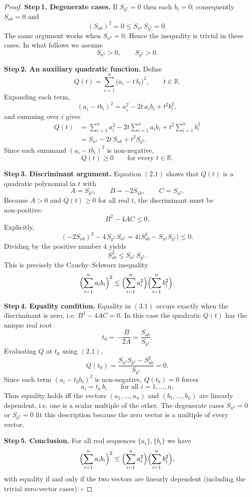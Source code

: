\begin{proof}
\textbf{Step 1. Degenerate cases.}  
If \(S_{b^{2}}=0\) then each \(b_{i}=0\); consequently \(S_{ab}=0\) and
\[
(S_{ab})^{2}=0\le S_{a^{2}}\,S_{b^{2}}=0 .
\]
The same argument works when \(S_{a^{2}}=0\). Hence the inequality is trivial
in these cases. In what follows we assume
\[
S_{a^{2}}>0,\qquad S_{b^{2}}>0 .
\]

\textbf{Step 2. An auxiliary quadratic function.}  
Define
\[
Q(t)=\sum_{i=1}^{n}\bigl(a_{i}-t\,b_{i}\bigr)^{2},\qquad t\in\mathbb{R}.
\]
Expanding each term,
\[
(a_{i}-t b_{i})^{2}=a_{i}^{2}-2t\,a_{i}b_{i}+t^{2}b_{i}^{2},
\]
and summing over \(i\) gives
\begin{align*}
Q(t)&=\sum_{i=1}^{n}a_{i}^{2}
      -2t\sum_{i=1}^{n}a_{i}b_{i}
      +t^{2}\sum_{i=1}^{n}b_{i}^{2}  \\
    &=S_{a^{2}}-2t\,S_{ab}+t^{2}S_{b^{2}}.\tag{2.1}
\end{align*}
Since each summand \((a_{i}-t b_{i})^{2}\) is non‑negative,
\[
Q(t)\ge0\qquad\text{for every }t\in\mathbb{R}.\tag{2.2}
\]

\textbf{Step 3. Discriminant argument.}  
Equation \((2.1)\) shows that \(Q(t)\) is a quadratic polynomial in \(t\) with
\[
A=S_{b^{2}},\qquad B=-2S_{ab},\qquad C=S_{a^{2}}.
\]
Because \(A>0\) and \(Q(t)\ge0\) for all real \(t\), the discriminant must be
non‑positive:
\[
B^{2}-4AC\le0 .
\]
Explicitly,
\[
(-2S_{ab})^{2}-4\,S_{b^{2}}\,S_{a^{2}}
=4\bigl(S_{ab}^{2}-S_{a^{2}}S_{b^{2}}\bigr)\le0 .
\]
Dividing by the positive number \(4\) yields
\[
S_{ab}^{2}\le S_{a^{2}}\,S_{b^{2}}.\tag{3.1}
\]
This is precisely the Cauchy–Schwarz inequality
\[
\Bigl(\sum_{i=1}^{n}a_{i}b_{i}\Bigr)^{2}
\le
\Bigl(\sum_{i=1}^{n}a_{i}^{2}\Bigr)
   \Bigl(\sum_{i=1}^{n}b_{i}^{2}\Bigr).
\]

\textbf{Step 4. Equality condition.}  
Equality in \((3.1)\) occurs exactly when the discriminant is zero, i.e.
\(B^{2}-4AC=0\). In this case the quadratic \(Q(t)\) has the unique real root
\[
t_{0}= -\frac{B}{2A}= \frac{S_{ab}}{S_{b^{2}}}.
\]
Evaluating \(Q\) at \(t_{0}\) using \((2.1)\),
\[
Q(t_{0})=\frac{S_{a^{2}}S_{b^{2}}-S_{ab}^{2}}{S_{b^{2}}}=0 .
\]
Since each term \((a_{i}-t_{0}b_{i})^{2}\) is non‑negative, \(Q(t_{0})=0\)
forces
\[
a_{i}=t_{0}\,b_{i}\qquad\text{for all }i=1,\dots ,n.
\]
Thus equality holds iff the vectors \((a_{1},\dots ,a_{n})\) and
\((b_{1},\dots ,b_{n})\) are linearly dependent, i.e. one is a scalar multiple
of the other. The degenerate cases \(S_{a^{2}}=0\) or \(S_{b^{2}}=0\) fit this
description because the zero vector is a multiple of every vector.

\textbf{Step 5. Conclusion.}  
For all real sequences \(\{a_{i}\},\{b_{i}\}\) we have
\[
\Bigl(\sum_{i=1}^{n}a_{i}b_{i}\Bigr)^{2}
\le
\Bigl(\sum_{i=1}^{n}a_{i}^{2}\Bigr)
   \Bigl(\sum_{i=1}^{n}b_{i}^{2}\Bigr),
\]
with equality if and only if the two vectors are linearly dependent (including
the trivial zero‑vector cases). \(\square\)
\end{proof}